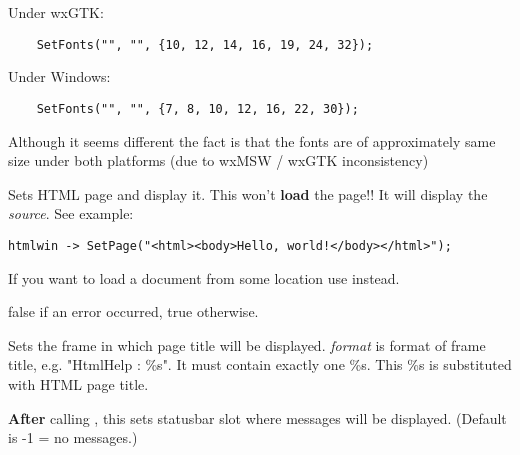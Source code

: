 
Under wxGTK:

\begin{verbatim}
    SetFonts("", "", {10, 12, 14, 16, 19, 24, 32});
\end{verbatim}

Under Windows:

\begin{verbatim}
    SetFonts("", "", {7, 8, 10, 12, 16, 22, 30});
\end{verbatim}

Although it seems different the fact is that the fonts are of approximately
same size under both platforms (due to wxMSW / wxGTK inconsistency)

\label{wxhtmlwindowsetpage}


Sets HTML page and display it. This won't {\bf load} the page!!
It will display the {\it source}. See example:

\begin{verbatim}
htmlwin -> SetPage("<html><body>Hello, world!</body></html>");
\end{verbatim}

If you want to load a document from some location use 
 instead.




false if an error occurred, true otherwise.

\label{wxhtmlwindowsetrelatedframe}


Sets the frame in which page title will be displayed. {\it format} is format of
frame title, e.g. "HtmlHelp : \%s". It must contain exactly one \%s. This
\%s is substituted with HTML page title.

\label{wxhtmlwindowsetrelatedstatusbar}


{\bf After} calling ,
this sets statusbar slot where messages will be displayed.
(Default is -1 = no messages.)

